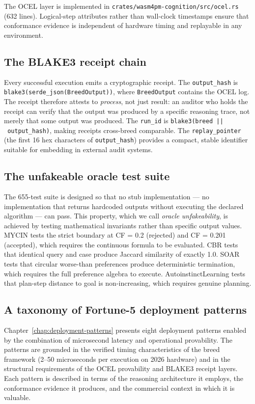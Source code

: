 The OCEL layer is implemented in \texttt{crates/wasm4pm-cognition/src/ocel.rs} (632
lines).
Logical-step attributes rather than wall-clock timestamps ensure that conformance
evidence is independent of hardware timing and replayable in any environment.

\subsection{The BLAKE3 receipt chain}

Every successful execution emits a cryptographic receipt.
The \texttt{output\_hash} is \texttt{blake3(serde\_json(BreedOutput))}, where
\texttt{BreedOutput} contains the OCEL log.
The receipt therefore attests to \emph{process}, not just result: an auditor who holds
the receipt can verify that the output was produced by a specific reasoning trace, not
merely that some output was produced.
The \texttt{run\_id} is \texttt{blake3(breed~||~output\_hash)}, making receipts
cross-breed comparable.
The \texttt{replay\_pointer} (the first 16 hex characters of \texttt{output\_hash})
provides a compact, stable identifier suitable for embedding in external audit systems.

\subsection{The unfakeable oracle test suite}

The 655-test suite is designed so that no stub implementation --- no implementation that
returns hardcoded outputs without executing the declared algorithm --- can pass.
This property, which we call \emph{oracle unfakeability}, is achieved by testing
mathematical invariants rather than specific output values.
MYCIN tests the strict boundary at CF = 0.2 (rejected) and CF = 0.201 (accepted), which
requires the continuous formula to be evaluated.
CBR tests that identical query and case produce Jaccard similarity of exactly 1.0.
SOAR tests that circular worse-than preferences produce deterministic termination, which
requires the full preference algebra to execute.
AutoinstinctLearning tests that plan-step distance to goal is non-increasing, which
requires genuine planning.

\subsection{A taxonomy of Fortune-5 deployment patterns}

Chapter~\ref{chap:deployment-patterns} presents eight deployment patterns enabled by the
combination of microsecond latency and operational provability.
The patterns are grounded in the verified timing characteristics of the breed framework
(2--50 microseconds per execution on 2026 hardware) and in the structural requirements
of the OCEL provability and BLAKE3 receipt layers.
Each pattern is described in terms of the reasoning architecture it employs, the
conformance evidence it produces, and the commercial context in which it is valuable.

